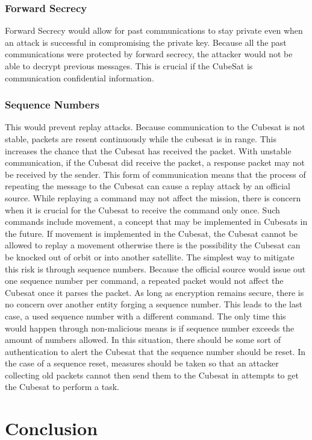 \documentclass[12pt]{article}
\begin{document}
\begin{multicols}{2}
\subsubsection{Forward Secrecy}
Forward Secrecy would allow for past communications to stay private even when an attack is successful in compromising the private key. Because all the past communications were protected by forward secrecy, the attacker would not be able to decrypt previous messages. This is crucial if the CubeSat is communication confidential information.
\subsubsection{Sequence Numbers}
This would prevent replay attacks. Because communication to the Cubesat is not stable, packets are resent continuously while the cubesat is in range. This increases the chance that the Cubesat has received the packet. With unstable communication, if the Cubesat did receive the packet, a response packet may not be received by the sender. This form of communication means that the process of repeating the message to the Cubesat can cause a replay attack by an official source. While replaying a command may not affect the mission, there is concern when it is crucial for the Cubesat to receive the command only once. Such commands include movement, a concept that may be implemented in Cubesats in the future. If movement is implemented in the Cubesat, the Cubesat cannot be allowed to replay a movement otherwise there is the possibility the Cubesat can be knocked out of orbit or into another satellite. The simplest way to mitigate this risk is through sequence numbers. Because the official source would issue out one sequence number per command, a repeated packet would not affect the Cubesat once it parses the packet. As long as encryption remains secure, there is no concern over another entity forging a sequence number. This leads to the last case, a used sequence number with a different command. The only time this would happen through non-malicious means is if sequence number exceeds the amount of numbers allowed. In this situation, there should be some sort of authentication to alert the Cubesat that the sequence number should be reset. In the case of a sequence reset, measures should be taken so that an attacker collecting old packets cannot then send them to the Cubesat in attempts to get the Cubesat to perform a task.
\section{Conclusion}
\end{multicols}
\clearpage
\nocite{*}
\def\UrlBreaks{\do\/\do-}




\end{document}
